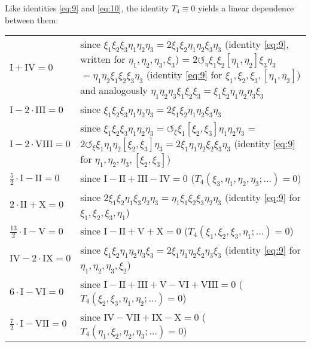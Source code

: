 \documentclass[a4paper]{article}
\begin{document}
Like identities \eqref{eq:9} and \eqref{eq:10}, the identity $T_4 \equiv 0$ yields a linear dependence between them:

\medskip

\begin{tabular}{p{2cm}p{8cm}}
	$\textrm{I} + \textrm{IV} = 0$
	& since $\xi_1 \xi_2 \xi_3 \eta_1 \eta_2 \eta_3 = 2 \xi_1 \xi_2 \eta_1 \eta_2 \xi_3 \eta_3$ (identity \eqref{eq:9}, written for $\eta_1, \eta_2, \eta_3, \xi_3$) = $2 \circlearrowleft_\eta \xi_1 \xi_2 [\eta_1,\eta_2] \xi_3\eta_3$ $=\eta_1 \eta_2\xi_1 \xi_2 \xi_3 \eta_3$ (identity \eqref{eq:9} for $\xi_1,\xi_2,\xi_3,[\eta_1,\eta_2]$) and analogously $\eta_1\eta_2\eta_3\xi_1\xi_2\xi_3=\xi_1\xi_2\eta_1\eta_2\eta_3\xi_3$
	\\
	$\textrm{I}-2\cdot\textrm{III} = 0$ & since $\xi_1\xi_2\xi_3\eta_1\eta_2\eta_3 = 2 \xi_1\xi_2\eta_1\eta_2\xi_3\eta_3$
	\\	
	$\textrm{I}-2\cdot\textrm{VIII} = 0$ & since $\xi_1\xi_2\xi_3\eta_1\eta_2\eta_3 = \circlearrowleft_\xi \xi_1[\xi_2,\xi_3]\eta_1\eta_2\eta_3 $ = $2 \circlearrowleft_\xi \xi_1 \eta_1 \eta_2 [\xi_2, \xi_3] \eta_3 = 2 \xi_1 \eta_1 \eta_2 \xi_2 \xi_3\eta_3$ (identity \eqref{eq:9} for $\eta_1,\eta_2,\eta_3,[\xi_2,\xi_3]$)
	\\
	$\frac 52 \cdot \textrm{I}-\textrm{II} = 0$ & since $\textrm{I}-\textrm{II}+\textrm{III}-\textrm{IV} = 0$ ($T_4(\xi_3,\eta_1,\eta_2,\eta_3;\dotsc) = 0$)
	\\
	$2\cdot\textrm{II}+\textrm{X} = 0$ & since $2\xi_1\xi_2\eta_1\xi_3\eta_2\eta_3 = \eta_1\xi_1\xi_2\xi_3\eta_2\eta_3$ (identity \eqref{eq:9} for $\xi_1,\xi_2,\xi_3,\eta_1$)
	\\
	$\frac {13}{2} \cdot \textrm{I}-\textrm{V} = 0$ & since $\textrm{I}-\textrm{II}+\textrm{V}+\textrm{X} = 0$ ($T_4(\xi_1,\xi_2,\xi_3,\eta_1;\dotsc) = 0$) 
	\\ 
	$\textrm{IV}-2\cdot\textrm{IX} = 0$ & since $\xi_1\xi_2\eta_1\eta_2\eta_3\xi_3 = 2\xi_1\eta_1\eta_2\xi_2\eta_3\xi_3$ (identity \eqref{eq:9} for $\eta_1,\eta_2,\eta_3,\xi_2$)
	\\
	$6\cdot \textrm{I}-\textrm{VI} = 0$ & since $\textrm{I}-\textrm{II}+\textrm{III}+\textrm{V}-\textrm{VI}+\textrm{VIII} = 0$
	\newline ($T_4(\xi_2,\xi_3,\eta_1,\eta_2;\dotsc) = 0$)
	\\ 
	$\frac 72 \cdot \textrm{I}-\textrm{VII} = 0$ & since $\textrm{IV}-\textrm{VII}+\textrm{IX}-\textrm{X} = 0$ ($T_4(\eta_1,\xi_2,\eta_2,\eta_3;\dotsc) = 0$)
\end{tabular}
\end{document}
